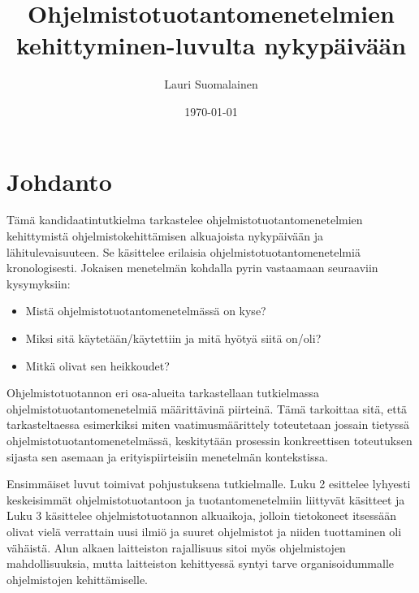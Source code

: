 \documentclass[finnish,12pt]{tktltiki2}
\title{Ohjelmistotuotantomenetelmien kehittyminen\newline 1950-luvulta nykypäivään}
\author{Lauri Suomalainen}
\date{\today}
\theoremstyle{definition}
\theoremstyle{remark}
\begin{document}

\frontmatter      %

\maketitle        %
\makeabstract     %

\tableofcontents  %


\mainmatter       %

\section{Johdanto}
\onehalfspacing

Tämä kandidaatintutkielma tarkastelee ohjelmistotuotantomenetelmien kehittymistä ohjelmistokehittämisen alkuajoista nykypäivään ja lähitulevaisuuteen. Se käsittelee erilaisia ohjelmistotuotantomenetelmiä kronologisesti. Jokaisen menetelmän kohdalla pyrin vastaamaan seuraaviin kysymyksiin:

\begin{itemize}
\item Mistä ohjelmistotuotantomenetelmässä on kyse?
\item Miksi sitä käytetään/käytettiin ja mitä hyötyä siitä on/oli?
\item Mitkä olivat sen heikkoudet?
\end{itemize}

Ohjelmistotuotannon eri osa-alueita tarkastellaan tutkielmassa ohjelmistotuotantomenetelmiä määrittävinä piirteinä. Tämä tarkoittaa sitä, että tarkasteltaessa esimerkiksi miten vaatimusmäärittely toteutetaan jossain tietyssä ohjelmistotuotantomenetelmässä, keskitytään prosessin konkreettisen toteutuksen sijasta sen asemaan ja erityispiirteisiin menetelmän kontekstissa.

Ensimmäiset luvut toimivat pohjustuksena tutkielmalle. Luku 2 esittelee lyhyesti keskeisimmät ohjelmistotuotantoon ja tuotantomenetelmiin liittyvät käsitteet ja Luku 3 käsittelee ohjelmistotuotannon alkuaikoja, jolloin tietokoneet itsessään olivat vielä verrattain uusi ilmiö ja suuret ohjelmistot ja niiden tuottaminen oli vähäistä. Alun alkaen laitteiston rajallisuus sitoi myös ohjelmistojen mahdollisuuksia, mutta laitteiston kehittyessä syntyi tarve organisoidummalle ohjelmistojen kehittämiselle.
\end{document}

